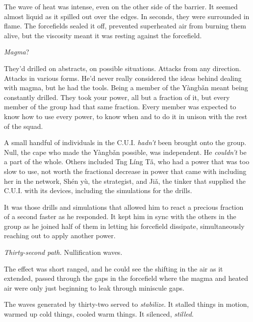 The wave of heat was intense, even on the other side of the barrier.  It seemed almost liquid as it spilled out over the edges.  In seconds, they were surrounded in flame.  The forcefields sealed it off, prevented superheated air from burning them alive, but the viscosity meant it was resting against the forcefield.



\emph{Magma}?



They'd drilled on abstracts, on possible situations.  Attacks from any direction.  Attacks in various forms.  He'd never really considered the ideas behind dealing with magma, but he had the tools.  Being a member of the Y\`{a}ngb\v{a}n meant being constantly drilled.  They took your power, all but a fraction of it, but every member of the group had that same fraction.  Every member was expected to know how to use every power, to know when and to do it in unison with the rest of the squad.



A small handful of individuals in the C.U.I. \emph{hadn't} been brought onto the group.  Null, the cape who made the Y\`{a}ngb\v{a}n possible, was independent.  He \emph{couldn't} be a part of the whole.  Others included Tng L\'{i}ng T\v{a}, who had a power that was too slow to use, not worth the fractional decrease in power that came with including her in the network, Sh\'{e}n y\`{u}, the strategist, and Ji\v{a}, the tinker that supplied the C.U.I. with its devices, including the simulations for the drills.



It was those drills and simulations that allowed him to react a precious fraction of a second faster as he responded.  It kept him in sync with the others in the group as he joined half of them in letting his forcefield dissipate, simultaneously reaching out to apply another power.



\emph{Thirty-second path.  }Nullification waves.



The effect was short ranged, and he could see the shifting in the air as it extended, passed through the gaps in the forcefield where the magma and heated air were only just beginning to leak through miniscule gaps.



The waves generated by thirty-two served to \emph{stabilize}.  It stalled things in motion, warmed up cold things, cooled warm things.  It silenced, \emph{stilled}.



